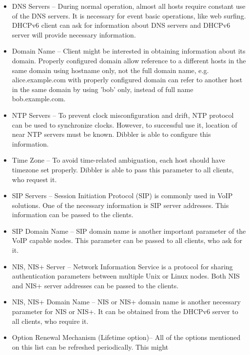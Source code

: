 \begin{itemize}
\item DNS Servers -- During normal operation, almost all hosts require
      constant use of the DNS servers. It is necessary for event basic
      operations, like web surfing. DHCPv6 client can ask for
      information about DNS servers and DHCPv6 server will provide
      necessary information. \cite{rfc3646}
\item Domain Name -- Client might be interested in obtaining information
      about its domain. Properly configured domain allow reference to a
      different hosts in the same domain using hostname only, not the
      full domain name, e.g. alice.example.com with properly configured
      domain can refer to another host in the same domain by using 'bob'
      only, instead of full name bob.example.com. \cite{rfc3646}
\item NTP Servers -- To prevent clock misconfiguration and drift, NTP
      protocol \cite{rfc2030} can be used to synchronize clocks. However, to
      successful use it, location of near NTP servers must be
      known. Dibbler is able to configure this information. \cite{rfc4075}
\item Time Zone -- To avoid time-related ambiguation, each host should
      have timezone set properly. Dibbler is able to pass this parameter
      to all clients, who request it. \cite{draft-timezone}
\item SIP Servers -- Session Initiation Protocol (SIP) \cite{rfc3263} is
      commonly used in VoIP solutions. One of the necessary information
      is SIP server addresses. This information can be passed to
      the clients. \cite{rfc3319}
\item SIP Domain Name -- SIP domain name is another important parameter
      of the VoIP capable nodes. This parameter can be passed to all
      clients, who ask for it. \cite{rfc3319}
\item NIS, NIS+ Server -- Network Information Service is a protocol for
      sharing authentication parameters between multiple Unix or Linux
      nodes. Both NIS and NIS+ server addresses can be passed to the
      clients. \cite{rfc3898}
\item NIS, NIS+ Domain Name -- NIS or NIS+ domain name is another necessary
      parameter for NIS or NIS+. It can be obtained from the DHCPv6
      server to all clients, who require it. \cite{rfc3898}
\item Option Renewal Mechanism (Lifetime option)-- All of the options
      mentioned on this list can be refreshed periodically. This might

\end{itemize}
